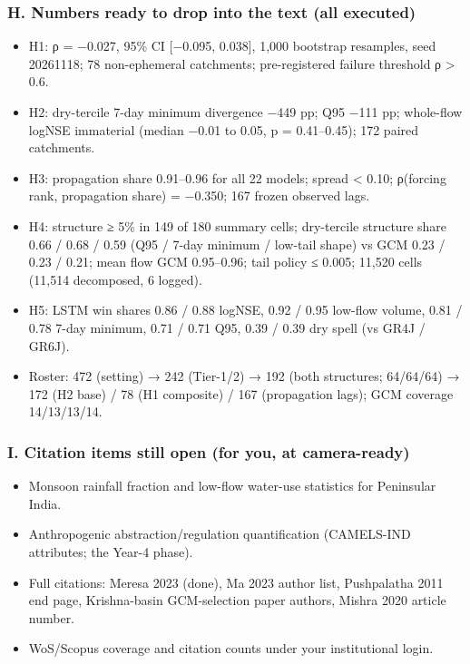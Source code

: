 \documentclass[
  english,
  11pt,
]{article}
\providecommand{\tightlist}{%
  \setlength{\itemsep}{0pt}\setlength{\parskip}{0pt}}
\begin{document}
\subsubsection{H. Numbers ready to drop into the text (all
executed)}\label{h.-numbers-ready-to-drop-into-the-text-all-executed}

\begin{itemize}
\tightlist
\item
  H1: ρ = −0.027, 95\% CI {[}−0.095, 0.038{]}, 1,000 bootstrap
  resamples, seed 20261118; 78 non-ephemeral catchments; pre-registered
  failure threshold ρ \textgreater{} 0.6.
\item
  H2: dry-tercile 7-day minimum divergence −449 pp; Q95 −111 pp;
  whole-flow logNSE immaterial (median −0.01 to 0.05, p = 0.41--0.45);
  172 paired catchments.
\item
  H3: propagation share 0.91--0.96 for all 22 models; spread \textless{}
  0.10; ρ(forcing rank, propagation share) = −0.350; 167 frozen observed
  lags.
\item
  H4: structure ≥ 5\% in 149 of 180 summary cells; dry-tercile structure
  share 0.66 / 0.68 / 0.59 (Q95 / 7-day minimum / low-tail shape) vs GCM
  0.23 / 0.23 / 0.21; mean flow GCM 0.95--0.96; tail policy ≤ 0.005;
  11,520 cells (11,514 decomposed, 6 logged).
\item
  H5: LSTM win shares 0.86 / 0.88 logNSE, 0.92 / 0.95 low-flow volume,
  0.81 / 0.78 7-day minimum, 0.71 / 0.71 Q95, 0.39 / 0.39 dry spell (vs
  GR4J / GR6J).
\item
  Roster: 472 (setting) → 242 (Tier-1/2) → 192 (both structures;
  64/64/64) → 172 (H2 base) / 78 (H1 composite) / 167 (propagation
  lags); GCM coverage 14/13/13/14.
\end{itemize}

\subsubsection{I. Citation items still open (for you, at
camera-ready)}\label{i.-citation-items-still-open-for-you-at-camera-ready}

\begin{itemize}
\tightlist
\item
  Monsoon rainfall fraction and low-flow water-use statistics for
  Peninsular India.
\item
  Anthropogenic abstraction/regulation quantification (CAMELS-IND
  attributes; the Year-4 phase).
\item
  Full citations: Meresa 2023 (done), Ma 2023 author list, Pushpalatha
  2011 end page, Krishna-basin GCM-selection paper authors, Mishra 2020
  article number.
\item
  WoS/Scopus coverage and citation counts under your institutional
  login.
\end{itemize}
\end{document}
